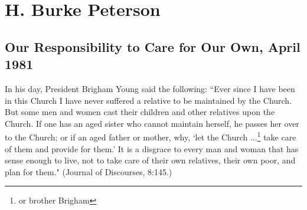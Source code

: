 \section{H. Burke Peterson}

\subsection{Our Responsibility to Care for Our Own, April 1981}

In his day, President Brigham Young said the following: ``Ever since I have been in this Church I have never suffered a relative to be maintained by the Church. But some men and women cast their children and other relatives upon the Church. If one has an aged sister who cannot maintain herself, he passes her over to the Church; or if an aged father or mother, why, `let the Church ...\footnote{or brother Brigham} take care of them and provide for them.' It is a disgrace to every man and woman that has sense enough to live, not to take care of their own relatives, their own poor, and plan for them." (Journal of Discourses, 8:145.)